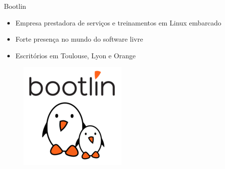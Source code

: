 \begin{frame}{Bootlin}

    \begin{itemize}
        \item Empresa prestadora de serviços e treinamentos em Linux embarcado
        \item Forte presença no mundo do software livre
        \item Escritórios em Toulouse, Lyon e Orange
    \end{itemize}
    
    \begin{figure}
        \centering
        \includegraphics[scale=0.6]{figuras/bootlin_logo.png}
        \label{fig:my_label}
    \end{figure}

\end{frame}
